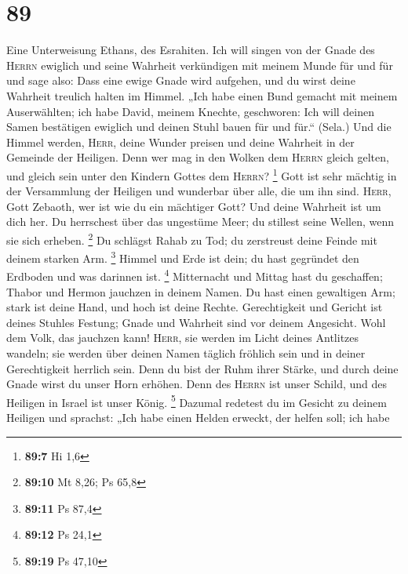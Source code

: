 \hypertarget{section-28}{%
\section{89}\label{section-28}}

 Eine Unterweisung Ethans, des Esrahiten. 
Ich will singen von der Gnade des \textsc{Herrn} ewiglich und seine
Wahrheit verkündigen mit meinem Munde für und für  und
sage also: Dass eine ewige Gnade wird aufgehen, und du wirst deine
Wahrheit treulich halten im Himmel.  „Ich habe einen Bund
gemacht mit meinem Auserwählten; ich habe David, meinem Knechte,
geschworen:  Ich will deinen Samen bestätigen ewiglich und
deinen Stuhl bauen für und für.`` (Sela.)  Und die Himmel
werden, \textsc{Herr}, deine Wunder preisen und deine Wahrheit in der
Gemeinde der Heiligen.  Denn wer mag in den Wolken dem
\textsc{Herrn} gleich gelten, und gleich sein unter den Kindern Gottes
dem \textsc{Herrn}? \footnote{\textbf{89:7} Hi 1,6}  Gott
ist sehr mächtig in der Versammlung der Heiligen und wunderbar über
alle, die um ihn sind.  \textsc{Herr}, Gott Zebaoth, wer
ist wie du ein mächtiger Gott? Und deine Wahrheit ist um dich her.
 Du herrschest über das ungestüme Meer; du stillest seine
Wellen, wenn sie sich erheben. \footnote{\textbf{89:10} Mt 8,26; Ps 65,8}
 Du schlägst Rahab zu Tod; du zerstreust deine Feinde mit
deinem starken Arm. \footnote{\textbf{89:11} Ps 87,4} 
Himmel und Erde ist dein; du hast gegründet den Erdboden und was
darinnen ist. \footnote{\textbf{89:12} Ps 24,1} 
Mitternacht und Mittag hast du geschaffen; Thabor und Hermon jauchzen in
deinem Namen.  Du hast einen gewaltigen Arm; stark ist
deine Hand, und hoch ist deine Rechte.  Gerechtigkeit und
Gericht ist deines Stuhles Festung; Gnade und Wahrheit sind vor deinem
Angesicht.  Wohl dem Volk, das jauchzen kann!
\textsc{Herr}, sie werden im Licht deines Antlitzes wandeln;
 sie werden über deinen Namen täglich fröhlich sein und
in deiner Gerechtigkeit herrlich sein.  Denn du bist der
Ruhm ihrer Stärke, und durch deine Gnade wirst du unser Horn erhöhen.
 Denn des \textsc{Herrn} ist unser Schild, und des
Heiligen in Israel ist unser König. \footnote{\textbf{89:19} Ps 47,10}
 Dazumal redetest du im Gesicht zu deinem Heiligen und
sprachst: „Ich habe einen Helden erweckt, der helfen soll; ich habe
